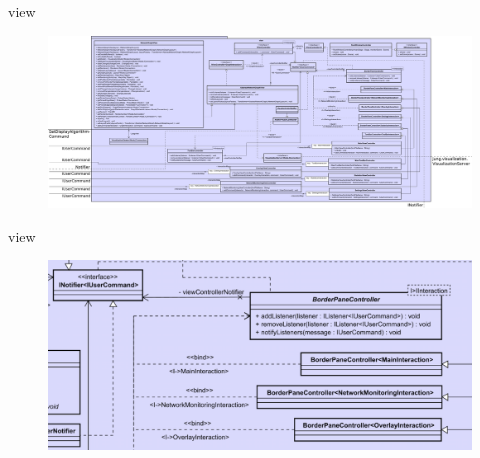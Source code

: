 \begin{frame}{view}
  \begin{figure}
    \centering
    \includegraphics[width=\textwidth]{./images/view.png}
  \end{figure}
\end{frame}

\begin{frame}{view}
  \begin{figure}
    \centering
    \includegraphics[width=\textwidth]{./images/view-cropped.png}
  \end{figure}
\end{frame}
